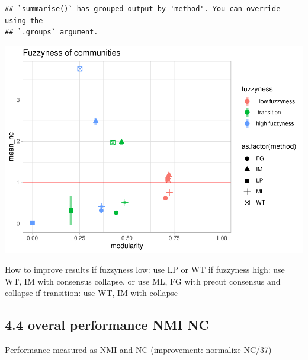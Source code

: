 \documentclass[
]{article}
\begin{document}
\begin{verbatim}
## `summarise()` has grouped output by 'method'. You can override using the
## `.groups` argument.
\end{verbatim}

\includegraphics{com_det_algorithms_files/figure-latex/unnamed-chunk-24-1.pdf}

How to improve results if fuzzyness low: use LP or WT if fuzzyness high:
use WT, IM with consensus collapse. or use ML, FG with precut consensus
and collapse if transition: use WT, IM with collapse \newpage

\hypertarget{overal-performance-nmi-nc}{%
\subsection{4.4 overal performance NMI
NC}\label{overal-performance-nmi-nc}}

Performance measured as NMI and NC (improvement: normalize NC/37)
\end{document}

